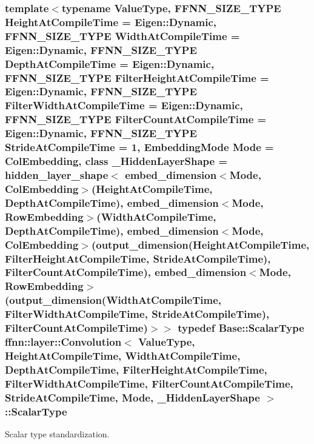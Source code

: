 \hypertarget{classffnn_1_1layer_1_1_convolution_a779ee450f39a97c1063d750416edb533}{
\subsubsection[{Scalar\-Type}]{\setlength{\rightskip}{0pt plus 5cm}template$<$typename Value\-Type, F\-F\-N\-N\-\_\-\-S\-I\-Z\-E\-\_\-\-T\-Y\-P\-E Height\-At\-Compile\-Time = Eigen\-::\-Dynamic, F\-F\-N\-N\-\_\-\-S\-I\-Z\-E\-\_\-\-T\-Y\-P\-E Width\-At\-Compile\-Time = Eigen\-::\-Dynamic, F\-F\-N\-N\-\_\-\-S\-I\-Z\-E\-\_\-\-T\-Y\-P\-E Depth\-At\-Compile\-Time = Eigen\-::\-Dynamic, F\-F\-N\-N\-\_\-\-S\-I\-Z\-E\-\_\-\-T\-Y\-P\-E Filter\-Height\-At\-Compile\-Time = Eigen\-::\-Dynamic, F\-F\-N\-N\-\_\-\-S\-I\-Z\-E\-\_\-\-T\-Y\-P\-E Filter\-Width\-At\-Compile\-Time = Eigen\-::\-Dynamic, F\-F\-N\-N\-\_\-\-S\-I\-Z\-E\-\_\-\-T\-Y\-P\-E Filter\-Count\-At\-Compile\-Time = Eigen\-::\-Dynamic, F\-F\-N\-N\-\_\-\-S\-I\-Z\-E\-\_\-\-T\-Y\-P\-E Stride\-At\-Compile\-Time = 1, Embedding\-Mode Mode = Col\-Embedding, class \-\_\-\-Hidden\-Layer\-Shape = hidden\-\_\-layer\-\_\-shape$<$              embed\-\_\-dimension$<$\-Mode, Col\-Embedding$>$(\-Height\-At\-Compile\-Time, Depth\-At\-Compile\-Time),              embed\-\_\-dimension$<$\-Mode, Row\-Embedding$>$(\-Width\-At\-Compile\-Time,  Depth\-At\-Compile\-Time),              embed\-\_\-dimension$<$\-Mode, Col\-Embedding$>$(output\-\_\-dimension(\-Height\-At\-Compile\-Time, Filter\-Height\-At\-Compile\-Time, Stride\-At\-Compile\-Time), Filter\-Count\-At\-Compile\-Time),              embed\-\_\-dimension$<$\-Mode, Row\-Embedding$>$(output\-\_\-dimension(\-Width\-At\-Compile\-Time,  Filter\-Width\-At\-Compile\-Time,  Stride\-At\-Compile\-Time), Filter\-Count\-At\-Compile\-Time)$>$$>$ typedef {\bf Base\-::\-Scalar\-Type} {\bf ffnn\-::layer\-::\-Convolution}$<$ Value\-Type, Height\-At\-Compile\-Time, Width\-At\-Compile\-Time, Depth\-At\-Compile\-Time, Filter\-Height\-At\-Compile\-Time, Filter\-Width\-At\-Compile\-Time, Filter\-Count\-At\-Compile\-Time, Stride\-At\-Compile\-Time, Mode, \-\_\-\-Hidden\-Layer\-Shape $>$\-::{\bf Scalar\-Type}}}\label{classffnn_1_1layer_1_1_convolution_a779ee450f39a97c1063d750416edb533}


Scalar type standardization. 

